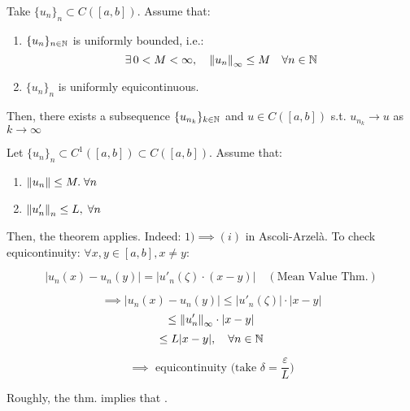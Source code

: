 \begin{ftheorem}
    Take $\{u_n\}_n \subset C([a, b])$. Assume that:
    \vspace{1em}
    \begin{enumerate}[label=(\roman*)]
        \item $\{u_n\}_{n \in \mathbb{N}}$ is uniformly bounded, i.e.:
        $$\exists \, 0 < M < \infty, \quad \left\|u_n\right\|_{\infty} \leq M \quad \forall n \in \mathbb{N}$$

        \vspace{1em}

        \item $\{u_n\}_n$ is uniformly equicontinuous.
    \end{enumerate}
    \vspace{1em}

    Then, there exists a subsequence $\{u_{n_k}\}_{k \in \mathbb{N}}$ and $u \in C([a, b])$
    s.t. $u_{n_k} \to u$ as $k \to \infty$
\end{ftheorem}

\begin{fexample}
    Let $\{u_n\}_n \subset C^1([a, b]) \subset C([a, b])$. Assume that:
    \vspace{1em}
    \begin{enumerate}
        \item $\left\|u_n\right\| \leq M. \; \forall n$
        \vspace{1em}
        \item $\left\|u'_n\right\|_n \leq L, \; \forall n$ 
    \end{enumerate}
    \vspace{1em}

    Then, the theorem applies. Indeed: $1) \implies (i)$ in Ascoli-Arzelà.
    To check equicontinuity: $\forall x, y \in [a, b], x \neq y$:

    $$|u_n(x) - u_n(y)| = |u'_n(\zeta) \cdot (x - y)| \quad (\text{Mean Value Thm.})$$ 

    $$\implies |u_n(x) - u_n(y)| \leq |u'_n(\zeta)| \cdot |x - y|$$
    $$\leq \left\|u'_n\right\|_{\infty} \cdot |x - y|$$
    $$\leq L |x - y|, \quad \forall n \in \mathbb{N}$$

    $$\implies \text{ equicontinuity (take } \delta = \frac{\varepsilon}{L})$$

    Roughly, the thm. implies that .
\end{fexample}

\vspace{1em}

